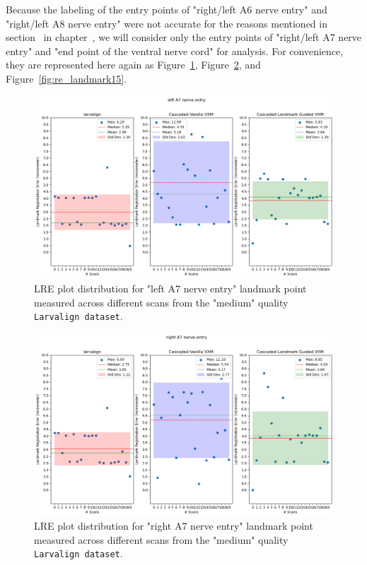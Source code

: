 \documentclass{book}
\begin{document}
	Because the labeling of the entry points of "right/left A6 nerve entry" and "right/left A8 nerve entry" were not accurate for the reasons mentioned in section~ in chapter~, we will consider only the entry points of "right/left A7 nerve entry" and "end point of the ventral nerve cord" for analysis. For convenience, they are represented here again as Figure~\ref{fig:re_landmark22}, Figure~\ref{fig:re_landmark27}, and Figure~\ref{fig:re_landmark15}.
	
	\begin{figure}[h!]
		\centering
		\includegraphics[width=0.75\columnwidth]{resources/chapter5_fresh/output/left A7 nerve entry.png}
		\caption{LRE plot distribution for "left A7 nerve entry" landmark point measured across different scans from the "medium" quality \texttt{Larvalign dataset}.}
		\label{fig:re_landmark22}
	\end{figure}
	
	\begin{figure}[h!]
		\centering
		\includegraphics[width=0.75\columnwidth]{resources/chapter5_fresh/output/right A7 nerve entry.png}
		\caption{LRE plot distribution for "right A7 nerve entry" landmark point measured across different scans from the "medium" quality \texttt{Larvalign dataset}.}
		\label{fig:re_landmark27}
	\end{figure}
	
\end{document}
